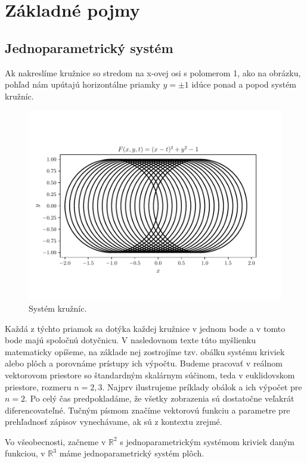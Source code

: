 \chapter{Základné pojmy}
\label{kap:kapitola1} %

\section{Jednoparametrický systém}
Ak nakreslíme kružnice so stredom na x-ovej osi s polomerom 1, ako na obrázku, pohľad nám upútajú horizontálne priamky $y = \pm 1$ idúce ponad a popod systém kružníc.

\begin{figure}[h]
	\centering
	\includegraphics{images/system.pdf}
	\caption[Systém kružníc.]{Systém kružníc.}
	\label{fig:system}
\end{figure}

Každá z týchto priamok sa dotýka každej kružnice v jednom bode a v tomto bode majú spoločnú dotyčnicu. V nasledovnom texte túto myšlienku matematicky opíšeme, na základe nej zostrojíme tzv. obálku systému kriviek alebo plôch a porovnáme prístupy ich výpočtu. Budeme pracovať v reálnom vektorovom priestore so štandardným skalárnym súčinom, teda v euklidovskom priestore, rozmeru $n = 2, 3.$ Najprv ilustrujeme príklady obálok a ich výpočet pre $ n = 2.$ Po celý čas predpokladáme, že všetky zobrazenia sú dostatočne veľakrát diferencovateľné. Tučným písmom značíme vektorovú funkciu a parametre pre prehľadnosť zápisov vynechávame, ak sú z kontextu zrejmé.

Vo všeobecnosti, začneme v $\mathbb{R}^2$ s jednoparametrickým systémom kriviek daným funkciou, v $\mathbb{R}^3$ máme jednoparametrický systém plôch.

